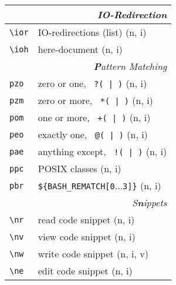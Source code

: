 \documentclass[oneside,11pt,landscape,DIV16]{scrartcl}
\begin{document}
\begin{multicols}{3}
\begin{center}
%
\begin{tabular}[]{|p{11mm}|p{62mm}|}
\hline
\multicolumn{2}{|r|}{\textsl{\textbf{I}O-Redirection}}                 \\[1.0ex]
\hline \verb'\ior'   & IO-redirections (list)           \hfill (n, i)\\
\hline \verb'\ioh'   & here-document                    \hfill (n, i)\\
\hline
%
\hline
\multicolumn{2}{|r|}{\textsl{\textbf{P}attern Matching}}     \\[1.0ex]
\hline     \verb'pzo' & zero or one,      \verb' ?( | )'  \hfill (n, i)\\ 
\hline     \verb'pzm' & zero or more,     \verb' *( | )'  \hfill (n, i)\\ 
\hline     \verb'pom' & one or more,      \verb' +( | )'  \hfill (n, i)\\ 
\hline     \verb'peo' & exactly one,      \verb' @( | )'  \hfill (n, i)\\ 
\hline     \verb'pae' & anything except,  \verb' !( | )'  \hfill (n, i)\\ 
\hline     \verb'ppc' & POSIX classes                     \hfill (n, i)\\ 
\hline     \verb'pbr' &  \verb'${BASH_REMATCH[0'$\ldots$\verb'3]}'  \hfill (n, i)\\ 
\hline
%
\hline
\multicolumn{2}{|r|}{\textsl{S\textbf{n}ippets}}               \\[1.0ex]
\hline \verb'\nr'  & read code snippet         \hfill (n, i)\\
\hline \verb'\nv'  & view code snippet         \hfill (n, i)\\
\hline \verb'\nw'  & write code snippet        \hfill (n, i, v)\\
\hline \verb'\ne'  & edit code snippet         \hfill (n, i)\\

\end{tabular}
\end{center}
\end{multicols}
\end{document}
